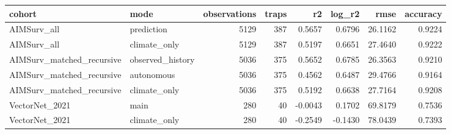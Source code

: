\begin{tabular}{llrrrrrr}
\toprule
cohort & mode & observations & traps & r2 & log\_r2 & rmse & accuracy \\
\midrule
AIMSurv\_all & prediction & 5129 & 387 & 0.5657 & 0.6796 & 26.1162 & 0.9224 \\
AIMSurv\_all & climate\_only & 5129 & 387 & 0.5197 & 0.6651 & 27.4640 & 0.9222 \\
AIMSurv\_matched\_recursive & observed\_history & 5036 & 375 & 0.5652 & 0.6785 & 26.3563 & 0.9210 \\
AIMSurv\_matched\_recursive & autonomous & 5036 & 375 & 0.4562 & 0.6487 & 29.4766 & 0.9164 \\
AIMSurv\_matched\_recursive & climate\_only & 5036 & 375 & 0.5192 & 0.6638 & 27.7164 & 0.9208 \\
VectorNet\_2021 & main & 280 & 40 & -0.0043 & 0.1702 & 69.8179 & 0.7536 \\
VectorNet\_2021 & climate\_only & 280 & 40 & -0.2549 & -0.1430 & 78.0439 & 0.7393 \\
\bottomrule
\end{tabular}
